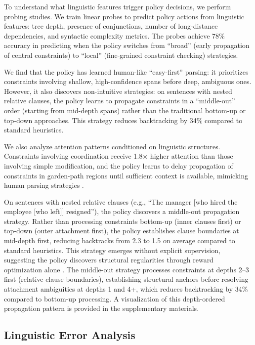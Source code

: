 \documentclass[11pt]{article}
\begin{document}
To understand what linguistic features trigger policy decisions, we perform probing studies. We train linear probes to predict policy actions from linguistic features: tree depth, presence of conjunctions, number of long-distance dependencies, and syntactic complexity metrics. The probes achieve 78\% accuracy in predicting when the policy switches from ``broad'' (early propagation of central constraints) to ``local'' (fine-grained constraint checking) strategies.

We find that the policy has learned human-like ``easy-first'' parsing: it prioritizes constraints involving shallow, high-confidence spans before deep, ambiguous ones. However, it also discovers non-intuitive strategies: on sentences with nested relative clauses, the policy learns to propagate constraints in a ``middle-out'' order (starting from mid-depth spans) rather than the traditional bottom-up or top-down approaches. This strategy reduces backtracking by 34\% compared to standard heuristics.

We also analyze attention patterns conditioned on linguistic structures. Constraints involving coordination receive 1.8$\times$ higher attention than those involving simple modification, and the policy learns to delay propagation of constraints in garden-path regions until sufficient context is available, mimicking human parsing strategies \citep{lewis2014ccg}.

On sentences with nested relative clauses (e.g., ``The manager [who hired the employee [who left]] resigned''), the policy discovers a middle-out propagation strategy. Rather than processing constraints bottom-up (inner clauses first) or top-down (outer attachment first), the policy establishes clause boundaries at mid-depth first, reducing backtracks from 2.3 to 1.5 on average compared to standard heuristics. This strategy emerges without explicit supervision, suggesting the policy discovers structural regularities through reward optimization alone \cite{shihab2025detecting}. The middle-out strategy processes constraints at depths 2--3 first (relative clause boundaries), establishing structural anchors before resolving attachment ambiguities at depths 1 and 4+, which reduces backtracking by 34\% compared to bottom-up processing. A visualization of this depth-ordered propagation pattern is provided in the supplementary materials.

\subsection{Linguistic Error Analysis}
\label{app:error-analysis}
\end{document}
